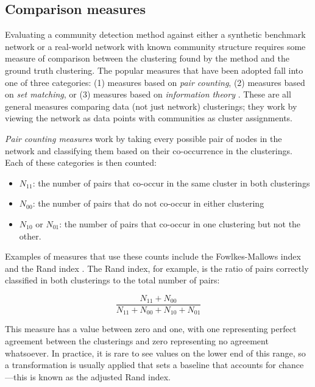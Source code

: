 \subsection{Comparison measures}\label{comparison-measures}

Evaluating a community detection method against either a synthetic
benchmark network or a real-world network with known community structure
requires some measure of comparison between the clustering found by the
method and the ground truth clustering. The popular measures that have
been adopted fall into one of three categories: (1) measures based on
\emph{pair counting}, (2) measures based on \emph{set matching}, or (3)
measures based on \emph{information theory}
\autocites{meila_comparing_2007}{vinh_information_2010}. These are all
general measures comparing data (not just network) clusterings; they
work by viewing the network as data points with communities as cluster
assignments.

\emph{Pair counting measures} work by taking every possible pair of
nodes in the network and classifying them based on their co-occurrence
in the clusterings. Each of these categories is then counted:

\begin{itemize}
\tightlist
\item
  \(N_{11}\): the number of pairs that co-occur in the same cluster in
  both clusterings
\item
  \(N_{00}\): the number of pairs that do not co-occur in either
  clustering
\item
  \(N_{10}\) or \(N_{01}\): the number of pairs that co-occur in one
  clustering but not the other.
\end{itemize}

Examples of measures that use these counts include the Fowlkes-Mallows
index \autocite{fowlkes_method_1983} and the Rand index
\autocite{rand_objective_1971}. The Rand index, for example, is the
ratio of pairs correctly classified in both clusterings to the total
number of pairs:

\[\frac{N_{11} + N_{00}}{N_{11} + N_{00} + N_{10} + N_{01}}\]

This measure has a value between zero and one, with one representing
perfect agreement between the clusterings and zero representing no
agreement whatsoever. In practice, it is rare to see values on the lower
end of this range, so a transformation is usually applied that sets a
baseline that accounts for chance---this is known as the adjusted Rand
index.

